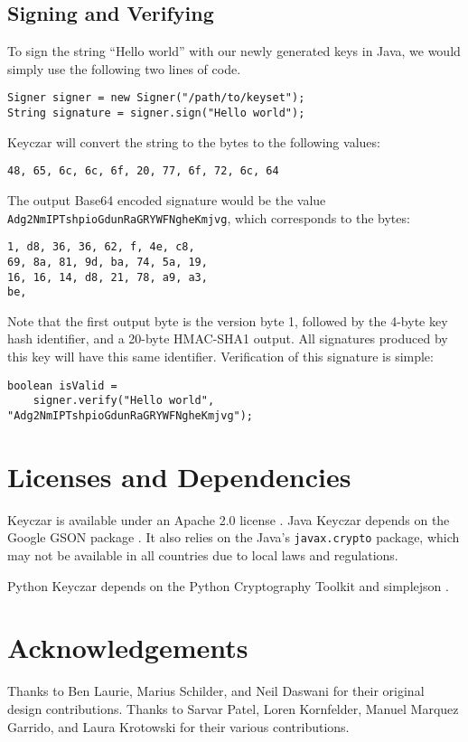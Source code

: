 \documentclass{llncs}
\begin{document}
\subsection{Signing and Verifying}

To sign the string ``Hello world'' with our newly generated keys in Java, we
would simply use the following two lines of code.

\begin{verbatim}
Signer signer = new Signer("/path/to/keyset");
String signature = signer.sign("Hello world");
\end{verbatim}

Keyczar will convert the string to the bytes to the following values:
\begin{verbatim}
48, 65, 6c, 6c, 6f, 20, 77, 6f, 72, 6c, 64
\end{verbatim}

The output Base64 encoded signature would be the value {\tt
Adg2NmIPTshpioGdunRaGRYWFNgheKmjvg}, which corresponds to the bytes:
\begin{verbatim}
1, d8, 36, 36, 62, f, 4e, c8,
69, 8a, 81, 9d, ba, 74, 5a, 19,
16, 16, 14, d8, 21, 78, a9, a3,
be,
\end{verbatim}

Note that the first output byte is the version byte 1, followed by the 4-byte
key hash identifier, and a 20-byte HMAC-SHA1 output. All signatures produced by
this key will have this same identifier. Verification of this signature is
simple:
\begin{verbatim}
boolean isValid =
    signer.verify("Hello world", "Adg2NmIPTshpioGdunRaGRYWFNgheKmjvg");
\end{verbatim}

\section{Licenses and Dependencies}

Keyczar is available under an Apache 2.0 license \cite{apache2}. Java Keyczar
depends on the Google GSON package \cite{google-gson}. It also relies on the
Java's {\tt javax.crypto} package, which may not be available in all countries
due to local laws and regulations.

Python Keyczar depends on the Python Cryptography Toolkit \cite{python-crypto}
and simplejson \cite{simplejson}.

\section{Acknowledgements}

Thanks to Ben Laurie, Marius Schilder, and Neil Daswani for their original
design contributions. Thanks to Sarvar Patel, Loren Kornfelder, Manuel Marquez
Garrido, and Laura Krotowski for their various contributions.



\end{document}
